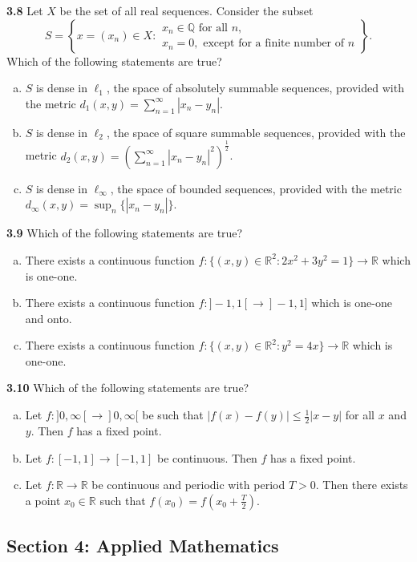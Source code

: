 \documentclass[11pt,a4paper]{article}
\newcommand{\Q}{\mathbb{Q}}
\newcommand{\R}{\mathbb{R}}
\newcommand{\examsec}[1]{%
  \subsection*{#1}
  \vspace{-2pt}
}
\newcommand{\qitem}[1]{\par\medskip\noindent\textbf{#1}\hspace{0.5em}}
\begin{document}
\qitem{3.8} Let $X$ be the set of all real sequences. Consider the subset
\[
  S = \left\{x = (x_n) \in X : \begin{array}{l}x_n \in \Q \text{ for all } n,\\ x_n = 0, \text{ except for a finite number of } n\end{array}\right\}.
\]
Which of the following statements are true?
\begin{enumerate}[a.]
  \item $S$ is dense in $\ell_1$, the space of absolutely summable sequences, provided with the metric $d_1(x, y) = \sum_{n=1}^{\infty} |x_n - y_n|$.
  \item $S$ is dense in $\ell_2$, the space of square summable sequences, provided with the metric $d_2(x, y) = \left(\sum_{n=1}^{\infty} |x_n - y_n|^2\right)^{\frac{1}{2}}$.
  \item $S$ is dense in $\ell_\infty$, the space of bounded sequences, provided with the metric $d_\infty(x, y) = \sup_n \{|x_n - y_n|\}$.
\end{enumerate}

\qitem{3.9} Which of the following statements are true?
\begin{enumerate}[a.]
  \item There exists a continuous function $f : \{(x, y) \in \R^2 : 2x^2 + 3y^2 = 1\} \to \R$ which is one-one.
  \item There exists a continuous function $f : ]-1, 1[ \to ]-1, 1]$ which is one-one and onto.
  \item There exists a continuous function $f : \{(x, y) \in \R^2 : y^2 = 4x\} \to \R$ which is one-one.
\end{enumerate}

\qitem{3.10} Which of the following statements are true?
\begin{enumerate}[a.]
  \item Let $f : ]0, \infty[ \to ]0, \infty[$ be such that $|f(x) - f(y)| \le \frac{1}{2}|x - y|$ for all $x$ and $y$. Then $f$ has a fixed point.
  \item Let $f : [-1, 1] \to [-1, 1]$ be continuous. Then $f$ has a fixed point.
  \item Let $f : \R \to \R$ be continuous and periodic with period $T > 0$. Then there exists a point $x_0 \in \R$ such that $f(x_0) = f\left(x_0 + \frac{T}{2}\right)$.
\end{enumerate}

\examsec{Section 4: Applied Mathematics}
\end{document}

